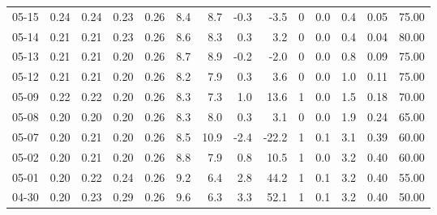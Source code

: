 \begin{threeparttable}
{\begin{tabular}{lrrrrrrrrrrrrr}
  05-15 &          0.24 &          0.24 &          0.23 &        0.26 &                 8.4 &                 8.7 &       -0.3 &         -3.5 &              0 &                 0.0 &              0.4 &            0.05 &                  75.00 \\
  05-14 &          0.21 &          0.21 &          0.23 &        0.26 &                 8.6 &                 8.3 &        0.3 &          3.2 &              0 &                 0.0 &              0.4 &            0.04 &                  80.00 \\
  05-13 &          0.21 &          0.21 &          0.20 &        0.26 &                 8.7 &                 8.9 &       -0.2 &         -2.0 &              0 &                 0.0 &              0.8 &            0.09 &                  75.00 \\
  05-12 &          0.21 &          0.21 &          0.20 &        0.26 &                 8.2 &                 7.9 &        0.3 &          3.6 &              0 &                 0.0 &              1.0 &            0.11 &                  75.00 \\
  05-09 &          0.22 &          0.22 &          0.20 &        0.26 &                 8.3 &                 7.3 &        1.0 &         13.6 &              1 &                 0.0 &              1.5 &            0.18 &                  70.00 \\
  05-08 &          0.20 &          0.20 &          0.20 &        0.26 &                 8.3 &                 8.0 &        0.3 &          3.1 &              0 &                 0.0 &              1.9 &            0.24 &                  65.00 \\
  05-07 &          0.20 &          0.21 &          0.20 &        0.26 &                 8.5 &                10.9 &       -2.4 &        -22.2 &              1 &                 0.1 &              3.1 &            0.39 &                  60.00 \\
  05-02 &          0.20 &          0.21 &          0.20 &        0.26 &                 8.8 &                 7.9 &        0.8 &         10.5 &              1 &                 0.0 &              3.2 &            0.40 &                  60.00 \\
  05-01 &          0.20 &          0.22 &          0.24 &        0.26 &                 9.2 &                 6.4 &        2.8 &         44.2 &              1 &                 0.1 &              3.2 &            0.40 &                  55.00 \\
  04-30 &          0.20 &          0.23 &          0.29 &        0.26 &                 9.6 &                 6.3 &        3.3 &         52.1 &              1 &                 0.1 &              3.2 &            0.40 &                  50.00 \\

\end{tabular}}
\end{threeparttable}
